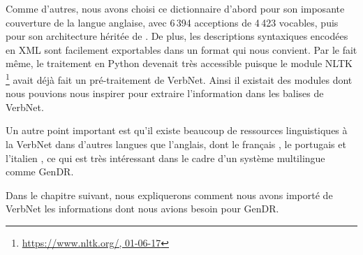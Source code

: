 
Comme d'autres, nous avons choisi ce dictionnaire d'abord pour son imposante couverture de la langue anglaise, avec 6\,394 acceptions de 4\,423 vocables, puis pour son architecture héritée de \cite{verb-classes.levin.1993}. De plus, les descriptions syntaxiques encodées en XML sont facilement exportables dans un format qui nous convient. Par le fait même, le traitement en Python devenait très accessible puisque le module NLTK \footnote{\url{https://www.nltk.org/, 01-06-17}} avait déjà fait un pré-traitement de VerbNet. Ainsi il existait des modules dont nous pouvions nous inspirer pour extraire l'information dans les balises de VerbNet. 

Un autre point important est qu'il existe beaucoup de ressources linguistiques à la VerbNet dans d'autres langues que l'anglais, dont le français \citep{danlos:hal-01179175}, le portugais \citep{ScartoncrosslinguisticVerbNetstylelexicon} et l'italien \citep{BussoItalianVerbNetConstructionbased}, ce qui est très intéressant dans le cadre d'un système multilingue comme GenDR.

Dans le chapitre suivant, nous expliquerons comment nous avons importé de VerbNet les informations dont nous avions besoin pour GenDR.